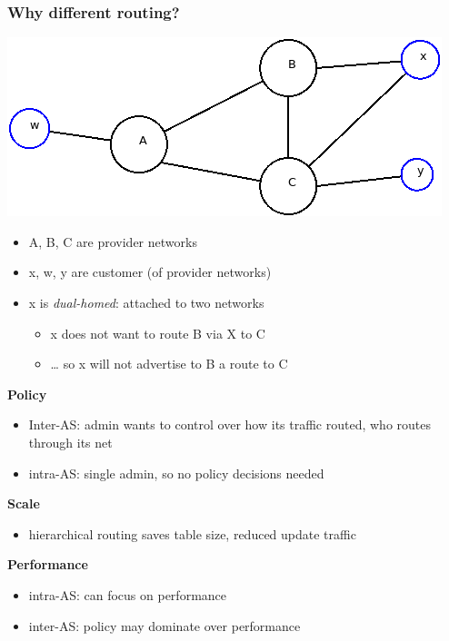 \documentclass[11pt]{article}
\begin{document}
\subsubsection{Why different routing?}
\label{sec:org9b88e26}

\begin{center}
\includegraphics[width=.9\linewidth]{../img/bgp.png}
\end{center}

\begin{itemize}
\item A, B, C are provider networks
\item x, w, y are customer (of provider networks)
\item x is \emph{dual-homed}: attached to two networks
\begin{itemize}
\item x does not want to route B via X to C
\item \ldots{} so x will not advertise to B a route to C
\end{itemize}
\end{itemize}

\textbf{Policy}
\begin{itemize}
\item Inter-AS: admin wants to control over how its traffic routed, who
routes through its net
\item intra-AS: single admin, so no policy decisions needed
\end{itemize}

\textbf{Scale}
\begin{itemize}
\item hierarchical routing saves table size, reduced update traffic
\end{itemize}

\textbf{Performance}
\begin{itemize}
\item intra-AS: can focus on performance
\item inter-AS: policy may dominate over performance
\end{itemize}
\end{document}
